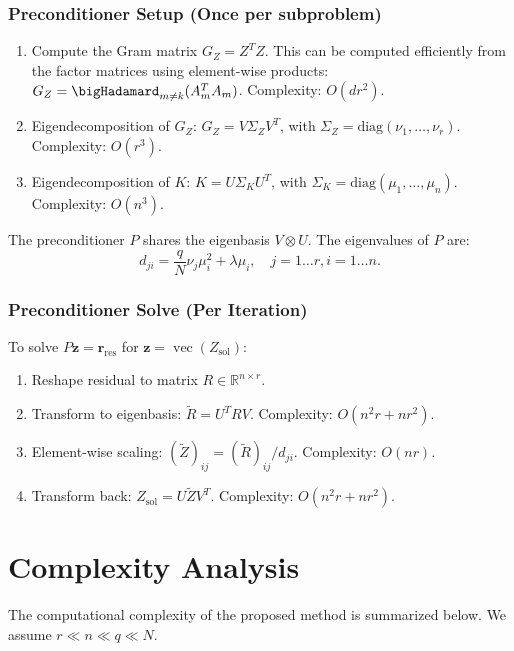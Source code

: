 \documentclass[11pt]{article}
\newcommand{\R}{\mathbb{R}}
\newcommand{\vecop}{\operatorname{vec}}
\newcommand{\Kron}{\otimes}
\begin{document}
\subsubsection{Preconditioner Setup (Once per subproblem)}
\begin{enumerate}
    \item Compute the Gram matrix $G_Z = Z^T Z$. This can be computed efficiently from the factor matrices using element-wise products: $G_Z = \bigHadamard_{m \neq k} (A_m^T A_m)$. Complexity: $O(d r^2)$.
    \item Eigendecomposition of $G_Z$: $G_Z = V \Sigma_Z V^T$, with $\Sigma_Z = \text{diag}(\nu_1, \dots, \nu_r)$. Complexity: $O(r^3)$.
    \item Eigendecomposition of $K$: $K = U \Sigma_K U^T$, with $\Sigma_K = \text{diag}(\mu_1, \dots, \mu_n)$. Complexity: $O(n^3)$.
\end{enumerate}

The preconditioner $P$ shares the eigenbasis $V \Kron U$. The eigenvalues of $P$ are:
\[ d_{ji} = \frac{q}{N} \nu_j \mu_i^2 + \lambda \mu_i, \quad j=1\dots r, i=1\dots n. \]

\subsubsection{Preconditioner Solve (Per Iteration)}
To solve $P \mathbf{z} = \mathbf{r}_{\text{res}}$ for $\mathbf{z} = \vecop(Z_{\text{sol}})$:
\begin{enumerate}
    \item Reshape residual to matrix $R \in \R^{n \times r}$.
    \item Transform to eigenbasis: $\tilde{R} = U^T R V$. Complexity: $O(n^2 r + n r^2)$.
    \item Element-wise scaling: $(\tilde{Z})_{ij} = (\tilde{R})_{ij} / d_{ji}$. Complexity: $O(nr)$.
    \item Transform back: $Z_{\text{sol}} = U \tilde{Z} V^T$. Complexity: $O(n^2 r + n r^2)$.
\end{enumerate}

\section{Complexity Analysis}

The computational complexity of the proposed method is summarized below. We assume $r \ll n \ll q \ll N$.
\end{document}
